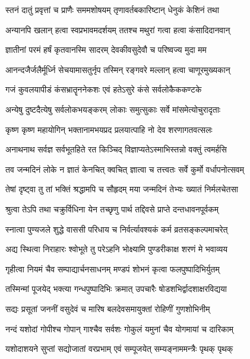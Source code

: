 \twolineshloka
{स्तनं दातुं प्रवृत्तां च प्राणैः सममशोषयम्}
{तृणावर्तबकारिष्टान् धेनुकं केशिनं तथा}%

\twolineshloka
{अन्यानपि खलान् हत्वा स्वप्रभावमदर्शयम्}
{ततश्च मथुरां गत्वा हत्वा कंसादिदानवान्}%

\twolineshloka
{ज्ञातीनां परमं हर्षं कृतवानस्मि सादरम्}
{देवकीवसुदेवौ च परिष्वज्य मुदा मम}%

\twolineshloka
{आनन्दजैर्जलैर्मूर्ध्नि सेचयामासतुर्नृप}
{तस्मिन् रङ्गवरे मल्लान् हत्वा चाणूरमुख्यकान्}%

\twolineshloka
{गजं कुवलयापीडं कंसभ्रातॄननेकशः}
{एवं हतेऽसुरे कंसे सर्वलोकैककण्टके}%

\twolineshloka
{अन्येषु दुष्टदैत्येषु सर्वलोकभयङ्करम्}
{लोकाः समुत्सुकाः सर्वे मांसमेत्योचुरादृताः}%

\twolineshloka
{कृष्ण कृष्ण महायोगिन् भक्तानामभयप्रद}
{प्रलयात्पाहि नो देव शरणागतवत्सलः}%

\twolineshloka
{अनाथनाथ सर्वज्ञ सर्वभूतहिते रत}
{किञ्चिद् विज्ञाप्यतेऽस्माभिस्तन्नो वक्तुं त्वमर्हसि}%

\twolineshloka
{तव जन्मदिनं लोके न ज्ञातं केनचित् क्वचित्}
{ज्ञात्वा च तत्त्वतः सर्वे कुर्मो वर्धापनोत्सवम्}%

\twolineshloka
{तेषां दृष्ट्वा तु तां भक्तिं श्रद्धामपि च सौहृदम्}
{मया जन्मदिनं तेभ्यः ख्यातं निर्मलचेतसा}%

\twolineshloka
{श्रुत्वा तेऽपि तथा चक्रुर्विधिना येन तच्छृणु}
{पार्थ तद्दिवसे प्राप्ते दन्तधावनपूर्वकम्}%

\twolineshloka
{स्नात्वा पुण्यजले शुद्धे वाससी परिधाय च}
{निर्वर्त्यावश्यकं कर्म व्रतसङ्कल्पमाचरेत्}%

\twolineshloka
{अद्य स्थित्वा निराहारः श्वोभूते तु परेऽहनि}
{भोक्ष्यामि पुण्डरीकाक्ष शरणं मे भवाव्यय}%

\twolineshloka
{गृहीत्वा नियमं चैव सम्पाद्यार्चनसाधनम्}
{मण्डपं शोभनं कृत्वा फलपुष्पादिभिर्युतम्}%

\twolineshloka
{तस्मिन्मां पूजयेद् भक्त्या गन्धपुष्पादिभिः क्रमात्}
{उपचारैः षोडशभिर्द्वादशाक्षरविद्यया}%

\twolineshloka
{सद्यः प्रसूतां जननीं वसुदेवं च मारिष}
{बलदेवसमायुक्तां रोहिणीं गुणशोभिनीम्}%

\twolineshloka
{नन्दं यशोदां गोपीश्च गोपान् गाश्चैव सर्वशः}
{गोकुलं यमुनां चैव योगमायां च दारिकाम्}%

\twolineshloka
{यशोदाशयने सुप्तां सद्योजातां वरप्रभाम्}
{एवं सम्पूजयेत् सम्यङ्नाममन्त्रैः पृथक् पृथक्}%

